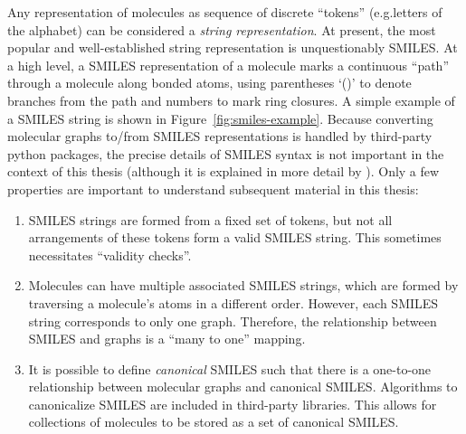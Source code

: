 Any representation of molecules as sequence of discrete ``tokens'' (e.g.\@ letters of the alphabet)
can be considered a \emph{string representation}.
At present, the most popular and well-established string representation is unquestionably SMILES.
At a high level, a SMILES representation of a molecule marks a continuous ``path'' through a molecule
along bonded atoms, using parentheses `()' to denote branches from the path and numbers
to mark ring closures.
A simple example of a SMILES string is shown in Figure~\ref{fig:smiles-example}.
Because converting molecular graphs to/from SMILES representations
is handled by third-party python packages,
the precise details of SMILES syntax is not important in the context of this thesis
(although it is explained in more detail by \citet{weininger1988smiles}).
Only a few properties are important to understand subsequent material in this thesis:
\begin{enumerate}
    \item SMILES strings are formed from a fixed set of tokens,
        but not all arrangements of these tokens form a valid SMILES string.
        This sometimes necessitates ``validity checks''.
    \item Molecules can have multiple associated SMILES strings,
        which are formed by traversing a molecule's atoms in a different order.
        However, each SMILES string corresponds to only one graph.
        Therefore, the relationship between SMILES and graphs is a ``many to one'' mapping.
    \item It is possible to define \emph{canonical} SMILES such that there is a one-to-one relationship between molecular graphs and canonical SMILES.
        Algorithms to canonicalize SMILES are included in third-party libraries.
        This allows for collections of molecules to be stored as a set of canonical SMILES.
\end{enumerate}

